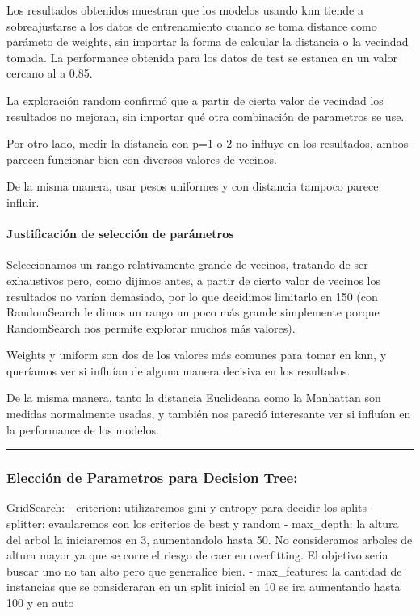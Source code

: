 \documentclass[11pt]{article}
\begin{document}
Los resultados obtenidos muestran que los modelos usando knn tiende a
sobreajustarse a los datos de entrenamiento cuando se toma distance como
parámeto de weights, sin importar la forma de calcular la distancia o la
vecindad tomada. La performance obtenida para los datos de test se
estanca en un valor cercano al a 0.85.

La exploración random confirmó que a partir de cierta valor de vecindad
los resultados no mejoran, sin importar qué otra combinación de
parametros se use.

Por otro lado, medir la distancia con p=1 o 2 no influye en los
resultados, ambos parecen funcionar bien con diversos valores de
vecinos.

De la misma manera, usar pesos uniformes y con distancia tampoco parece
influir.

\paragraph{Justificación de selección de
parámetros}\label{justificaciuxf3n-de-selecciuxf3n-de-paruxe1metros}

Seleccionamos un rango relativamente grande de vecinos, tratando de ser
exhaustivos pero, como dijimos antes, a partir de cierto valor de
vecinos los resultados no varían demasiado, por lo que decidimos
limitarlo en 150 (con RandomSearch le dimos un rango un poco más grande
simplemente porque RandomSearch nos permite explorar muchos más
valores).

Weights y uniform son dos de los valores más comunes para tomar en knn,
y queríamos ver si influían de alguna manera decisiva en los resultados.

De la misma manera, tanto la distancia Euclideana como la Manhattan son
medidas normalmente usadas, y también nos pareció interesante ver si
influían en la performance de los modelos.

\begin{center}\rule{0.5\linewidth}{\linethickness}\end{center}

    \subsubsection{Elección de Parametros para Decision
Tree:}\label{elecciuxf3n-de-parametros-para-decision-tree}

GridSearch: - criterion: utilizaremos gini y entropy para decidir los
splits - splitter: evaularemos con los criterios de best y random -
max\_depth: la altura del arbol la iniciaremos en 3, aumentandolo hasta
50. No consideramos arboles de altura mayor ya que se corre el riesgo de
caer en overfitting. El objetivo seria buscar uno no tan alto pero que
generalice bien. - max\_features: la cantidad de instancias que se
consideraran en un split inicial en 10 se ira aumentando hasta 100 y en
auto
\end{document}
